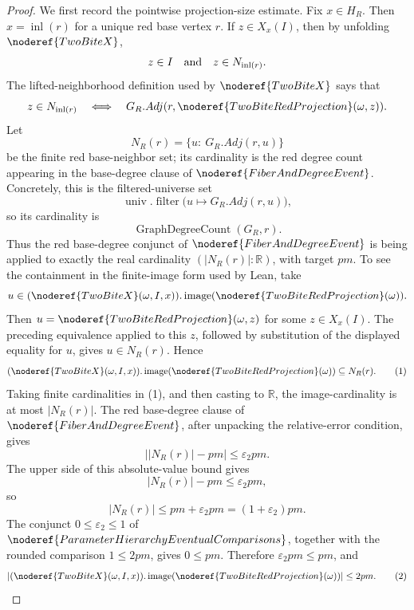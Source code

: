 \begin{proof}
We first record the pointwise projection-size estimate.  Fix \(x\in H_R\).
Then \(x=\operatorname{inl}(r)\) for a unique red base vertex \(r\).  If
\(z\in X_x(I)\), then by unfolding \(\noderef{TwoBiteX}\),
\[
z\in I\quad\hbox{and}\quad z\in N_{\operatorname{inl}(r)}.
\]
The lifted-neighborhood definition used by \(\noderef{TwoBiteX}\) says that
\[
z\in N_{\operatorname{inl}(r)}
\quad\Longleftrightarrow\quad
G_R.Adj(r,\noderef{TwoBiteRedProjection}(\omega,z)).
\]
Let
\[
N_R(r)=\{u:\ G_R.Adj(r,u)\}
\]
be the finite red base-neighbor set; its cardinality is the red degree count
appearing in the base-degree clause of \(\noderef{FiberAndDegreeEvent}\).
Concretely, this is the filtered-universe set
\[
\operatorname{univ}.\operatorname{filter}
  \bigl(u\mapsto G_R.Adj(r,u)\bigr),
\]
so its cardinality is
\[
\operatorname{GraphDegreeCount}(G_R,r).
\]
Thus the red base-degree conjunct of \(\noderef{FiberAndDegreeEvent}\) is
being applied to exactly the real cardinality \((|N_R(r)|:\mathbb R)\), with
target \(pm\).
To see the containment in the finite-image form used by Lean, take
\[
u\in(\noderef{TwoBiteX}(\omega,I,x)).\operatorname{image}
      (\noderef{TwoBiteRedProjection}(\omega)).
\]
Then \(u=\noderef{TwoBiteRedProjection}(\omega,z)\) for some \(z\in X_x(I)\).
The preceding equivalence applied to this \(z\), followed by substitution of
the displayed equality for \(u\), gives \(u\in N_R(r)\).  Hence
\[
(\noderef{TwoBiteX}(\omega,I,x)).\operatorname{image}
      (\noderef{TwoBiteRedProjection}(\omega))
\subseteq N_R(r). \tag{1}
\]
Taking finite cardinalities in (1), and then casting to \(\mathbb R\), the
image-cardinality is at most \(|N_R(r)|\).  The red base-degree clause of
\(\noderef{FiberAndDegreeEvent}\), after unpacking the relative-error
condition, gives
\[
\bigl||N_R(r)|-pm\bigr|\le\varepsilon_2pm.
\]
The upper side of this absolute-value bound gives
\[
|N_R(r)|-pm\le\varepsilon_2pm,
\]
so
\[
|N_R(r)|\le pm+\varepsilon_2pm=(1+\varepsilon_2)pm.
\]
The conjunct \(0\le\varepsilon_2\le1\) of
\(\noderef{ParameterHierarchyEventualComparisons}\), together with the rounded
comparison \(1\le2pm\), gives \(0\le pm\).  Therefore
\(\varepsilon_2pm\le pm\), and
\[
|(\noderef{TwoBiteX}(\omega,I,x)).\operatorname{image}
      (\noderef{TwoBiteRedProjection}(\omega))|
\le2pm. \tag{2}
\]


\end{proof}
